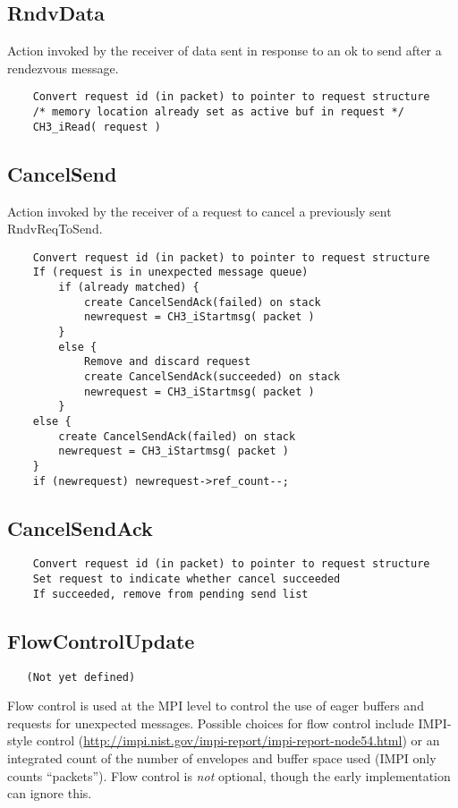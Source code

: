 \documentclass{article}
\begin{document}
\subsection{RndvData}
Action invoked by the receiver of data sent in response to an ok to send after
a rendezvous message.
\begin{verbatim}
    Convert request id (in packet) to pointer to request structure
    /* memory location already set as active buf in request */
    CH3_iRead( request )
\end{verbatim}

\subsection{CancelSend}
Action invoked by the receiver of a request to cancel a previously sent
RndvReqToSend. 
\begin{verbatim}
    Convert request id (in packet) to pointer to request structure
    If (request is in unexpected message queue)
        if (already matched) {
            create CancelSendAck(failed) on stack
            newrequest = CH3_iStartmsg( packet )
        }
        else {
            Remove and discard request
            create CancelSendAck(succeeded) on stack
            newrequest = CH3_iStartmsg( packet )
        }
    else {
        create CancelSendAck(failed) on stack
        newrequest = CH3_iStartmsg( packet )
    }
    if (newrequest) newrequest->ref_count--;
\end{verbatim}

\subsection{CancelSendAck}
\begin{verbatim}
    Convert request id (in packet) to pointer to request structure
    Set request to indicate whether cancel succeeded
    If succeeded, remove from pending send list
\end{verbatim}

\subsection{FlowControlUpdate}
\begin{verbatim}
   (Not yet defined)
\end{verbatim}
Flow control is used at the MPI level to control the use of eager buffers and
requests for unexpected messages.  Possible choices for flow control include
IMPI-style control
(\url{http://impi.nist.gov/impi-report/impi-report-node54.html}) or an
integrated count of the number of envelopes and 
buffer space used (IMPI only counts ``packets'').  Flow control is \emph{not}
optional, though the early 
implementation can ignore this.
\end{document}
